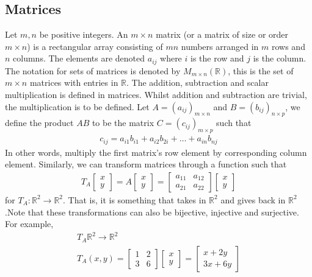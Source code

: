 \documentclass[a4paper]{article}
\theoremstyle{plain}
\theoremstyle{definition}
\theoremstyle{remark}
\begin{document}
\subsection{Matrices}
Let $m,n$ be positive integers. An $m \times n$ matrix (or a matrix of size or order $m \times n$) is a rectangular array consisting of $mn$ numbers arranged in $m$ rows and $n$ columns. The elements are denoted $a_{ij}$ where $i$ is the row and $j$ is the column. The notation for sets of matrices is denoted by $M_{m \times n}(\mathbb{R})$, this is the set of $m \times n$ matrices with entries in $\mathbb{R}$. The addition, subtraction and scalar multiplication is defined in matrices. Whilst addition and subtraction are trivial, the multiplication is to be defined. Let $A = (a_{ij})_{m\times n}$ and $B = (b_{ij})_{n \times p}$, we define the product $AB$ to be the matrix $C = (c_{ij})_{m \times p}$ such that
\begin{align*}
	c_{ij} = a_{i1}b_{i1} + a_{i2}b_{2i} + \ldots + a_{in}b_{nj}
\end{align*}
In other words, multiply the first matrix's row element by corresponding column element. Similarly, we can transform matrices through a function such that 
\begin{align*}
	T_A \begin{bmatrix} x \\ y \end{bmatrix} = A \begin{bmatrix} x \\ y \end{bmatrix}  = \begin{bmatrix} a_{11} & a_{12} \\ a_{21} & a_{22} \end{bmatrix} \begin{bmatrix} x \\ y \end{bmatrix} 
\end{align*}
for $T_A : \mathbb{R}^2 \to  \mathbb{R}^2$. That is, it is something that takes in $\mathbb{R}^2$ and gives back in $\mathbb{R}^2$.Note that these transformations can also be bijective, injective and surjective. For example,
\begin{align*}
	T_A \mathbb{R}^2 \to  \mathbb{R}^2 \\
	T_A(x,y) = \begin{bmatrix} 1 & 2 \\ 3 & 6 \end{bmatrix}  \begin{bmatrix} x \\ y \end{bmatrix}  = \begin{bmatrix} x + 2y \\ 3x+6y \end{bmatrix} 
\end{align*}
\end{document}
